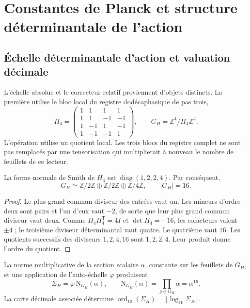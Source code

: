\section{Constantes de Planck et structure déterminantale de l'action}
\label{ii:sec:action}
\subsection{Échelle déterminantale d'action et valuation décimale}

L'échelle absolue et le correcteur relatif proviennent d'objets
distincts. La première utilise le bloc local du registre dodécaphasique
de pas trois,
\begin{equation}
 H_4=\begin{pmatrix}
 1&1&1&1\\1&1&-1&-1\\1&-1&1&-1\\1&-1&-1&1
 \end{pmatrix},\qquad
 G_H=\mathbb Z^4/H_4\mathbb Z^4.
 \label{ii:eq:el-h4}
\end{equation}
L'opération utilise un quotient local. Les trois blocs du registre
complet ne sont pas remplacés par une tensorisation qui multiplierait à
nouveau le nombre de feuillets de ce lecteur.

\begin{lemma}
La forme normale de Smith de \(H_4\) est
\(\operatorname{diag}(1,2,2,4)\). Par conséquent,
\[
 G_H\simeq\mathbb Z/2\mathbb Z\oplus\mathbb Z/2\mathbb Z
 \oplus\mathbb Z/4\mathbb Z,\qquad |G_H|=16.
\]
\end{lemma}
\begin{proof}
Le plus grand commun diviseur des entrées vaut un. Les mineurs d'ordre deux
sont pairs et l'un d'eux vaut \(-2\), de sorte que leur plus grand commun diviseur
vaut deux. Comme \(H_4H_4^{\mathsf T}=4I\) et \(\det H_4=-16\), les
cofacteurs valent \(\pm4\) ; le troisième diviseur déterminantal vaut quatre.
Le quatrième vaut \(16\). Les quotients successifs des diviseurs
\(1,2,4,16\) sont \(1,2,2,4\). Leur produit donne l'ordre du quotient.
\end{proof}

\begin{definition}
La norme multiplicative de la section scalaire \(\alpha\), constante
sur les feuillets de \(G_H\), et une application de l'auto-échelle
\(\varphi\) produisent
\begin{equation}
 \Sigma_H=\varphi\,\mathrm N_{G_H}(\alpha),\qquad
 \mathrm N_{G_H}(\alpha)=\prod_{g\in G_H}\alpha=\alpha^{16}.
 \label{ii:eq:el-lector-determinantal}
\end{equation}
La carte décimale associée détermine
\(\operatorname{ord}_{10}(\Sigma_H)=\lfloor\log_{10}\Sigma_H\rfloor\).
\end{definition}


